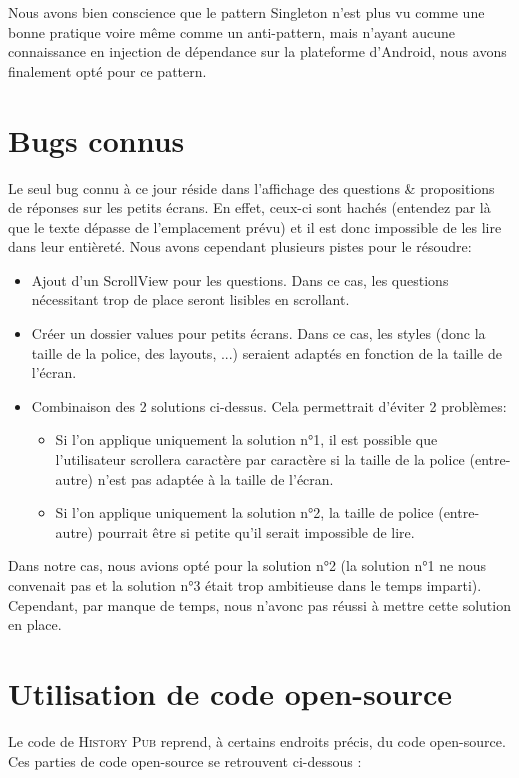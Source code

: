 \documentclass[11pt]{scrreprt}
\begin{document}
    Nous avons bien conscience que le pattern Singleton n'est plus vu comme une bonne pratique voire même comme un anti-pattern, mais n'ayant aucune connaissance en injection de dépendance sur la plateforme d'Android, nous avons finalement opté pour ce pattern.

    \chapter{Bugs connus}
    Le seul bug connu à ce jour réside dans l'affichage des questions & propositions de réponses sur les petits écrans. En effet, ceux-ci sont hachés (entendez par là que le texte dépasse de l'emplacement prévu) et il est donc impossible de les lire dans leur entièreté.
    Nous avons cependant plusieurs pistes pour le résoudre:
     \begin{itemize}
         \item Ajout d'un ScrollView pour les questions. Dans ce cas, les questions nécessitant trop de place seront lisibles en scrollant.
         \item Créer un dossier values pour petits écrans. Dans ce cas, les styles (donc la taille de la police, des layouts, ...) seraient adaptés en fonction de la taille de l'écran.
         \item Combinaison des 2 solutions ci-dessus. Cela permettrait d'éviter 2 problèmes:
            \begin{itemize}
                     \item Si l'on applique uniquement la solution n°1, il est possible que l'utilisateur scrollera caractère par caractère si la taille de la police (entre-autre) n'est pas adaptée à la taille de l'écran.
                     \item Si l'on applique uniquement la solution n°2, la taille de police (entre-autre) pourrait être si petite qu'il serait impossible de lire.
                 \end{itemize}
     \end{itemize}
     Dans notre cas, nous avions opté pour la solution n°2 (la solution n°1 ne nous convenait pas et la solution n°3 était trop ambitieuse dans le temps imparti). Cependant, par manque de temps, nous n'avonc pas réussi à mettre cette solution en place.

    \chapter{Utilisation de code open-source}
    Le code de \textsc{History Pub} reprend, à certains endroits précis, du code open-source. Ces parties de code open-source se retrouvent ci-dessous :
\end{document}
